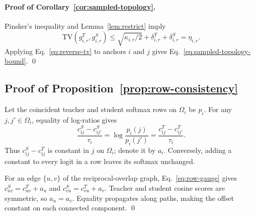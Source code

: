 \paragraph{Proof of Corollary~\ref{cor:sampled-topology}.}
Pinsker's inequality and Lemma~\ref{lem:restrict} imply
\begin{equation}
\mathrm{TV}(g^T_{i,r},g^S_{i,r})
\leq
\sqrt{\kappa_{i,r}/2}+\delta^T_{i,r}+\delta^S_{i,r}
=\eta_{i,r}.
\end{equation}
Applying Eq.~\eqref{eq:reverse-tv} to anchors $i$ and $j$ gives
Eq.~\eqref{eq:sampled-topology-bound}. \qed

\subsection{Proof of Proposition~\ref{prop:row-consistency}}
\label{app:proof-gauge}

Let the coincident teacher and student softmax rows on $\Omega_i$ be $p_i$.
For any $j,j'\in\Omega_i$, equality of log-ratios gives
\begin{equation}
\frac{c^S_{ij}-c^S_{ij'}}{\tau_i}
=\log\frac{p_i(j)}{p_i(j')}
=\frac{c^T_{ij}-c^T_{ij'}}{\tau_i}.
\end{equation}
Thus $c^S_{ij}-c^T_{ij}$ is constant in $j$ on $\Omega_i$; denote it by
$a_i$. Conversely, adding a constant to every logit in a row leaves its
softmax unchanged.

For an edge $\{u,v\}$ of the reciprocal-overlap graph,
Eq.~\eqref{eq:row-gauge} gives
$c^S_{uv}=c^T_{uv}+a_u$ and $c^S_{vu}=c^T_{vu}+a_v$.
Teacher and student cosine scores are symmetric, so $a_u=a_v$. Equality
propagates along paths, making the offset constant on each connected
component. \qed
